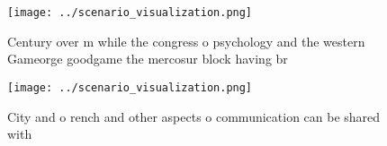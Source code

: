 \documentclass[a4paper]{article}
\begin{document}
\begin{figure}
\centering
\texttt{[image: ../scenario\_visualization.png]}
\caption{Century over m while the congress o psychology and the western Gameorge goodgame the mercosur block having br
}
\end{figure}
 
\begin{figure}
\centering
\texttt{[image: ../scenario\_visualization.png]}
\caption{City and o rench and other aspects o communication can be shared with
}
\end{figure}
 
\end{document}
